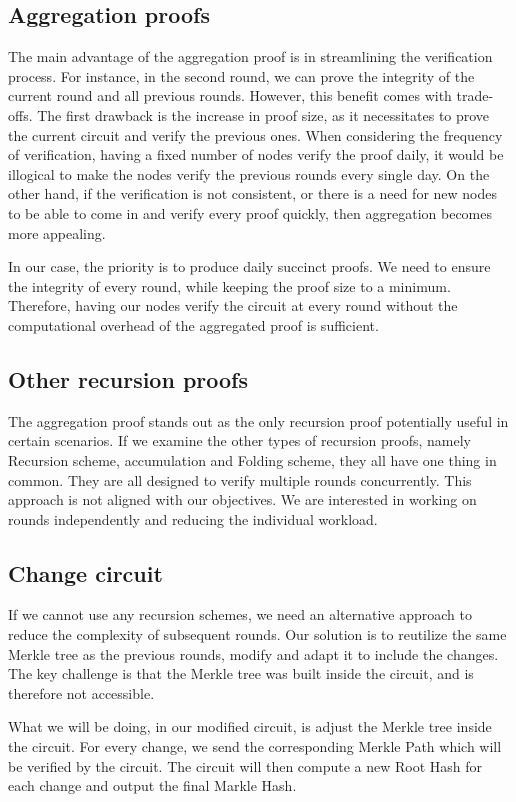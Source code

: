 \subsection{Aggregation proofs}
The main advantage of the aggregation proof is in streamlining the verification process. For instance, in the second round, we can prove the integrity of the current round and all previous rounds.
However, this benefit comes with trade-offs. The first drawback is the increase in proof size, as it necessitates to prove the current circuit and verify the previous ones.
When considering the frequency of verification, having a fixed number of nodes verify the proof daily, it would be illogical to make the nodes verify the previous rounds every single day.
On the other hand, if the verification is not consistent, or there is a need for new nodes to be able to come in and verify every proof quickly, then aggregation becomes more appealing.

In our case, the priority is to produce daily succinct proofs. We need to ensure the integrity of every round, while keeping the proof size to a minimum.
Therefore, having our nodes verify the circuit at every round without the computational overhead of the aggregated proof is sufficient.

\subsection{Other recursion proofs}
The aggregation proof stands out as the only recursion proof potentially useful in certain scenarios.
If we examine the other types of recursion proofs, namely Recursion scheme, accumulation and Folding scheme, they all have one thing in common.
They are all designed to verify multiple rounds concurrently.
This approach is not aligned with our objectives. We are interested in working on rounds independently and reducing the individual workload.

\subsection{Change circuit}
If we cannot use any recursion schemes, we need an alternative approach to reduce the complexity of subsequent rounds.
Our solution is to reutilize the same Merkle tree as the previous rounds, modify  and adapt it to include the changes.
The key challenge is that the Merkle tree was built inside the circuit, and is therefore not accessible.

What we will be doing, in our modified circuit, is adjust the Merkle tree inside the circuit.
For every change, we send the corresponding Merkle Path which will be verified by the circuit.
The circuit will then compute a new Root Hash for each change and output the final Markle Hash.

